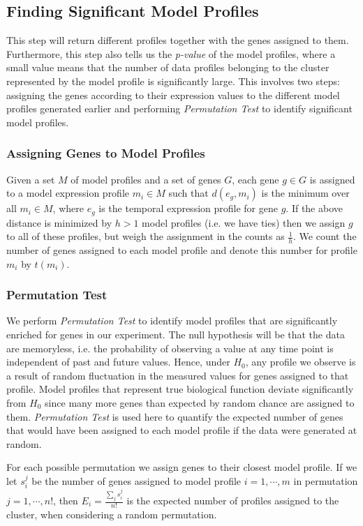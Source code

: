 \subsection{Finding Significant Model Profiles}
This step will return different profiles together with the genes assigned to them. Furthermore, this step also tells us the \textit{p-value} of the model profiles, where a small value means that the number of data profiles belonging to the cluster represented by the model profile is significantly large. This involves two steps: assigning the genes according to their expression values to the different model profiles generated earlier and performing \textit{Permutation Test} to identify significant model profiles.

\subsubsection{Assigning Genes to Model Profiles}
Given a set $M$ of model profiles and a set of genes $G$, each gene $g \in G$ is assigned to a model expression profile $m_i \in M$ such that $d(e_g, m_i)$ is the minimum over all $m_i \in M$, where $e_g$ is the temporal expression profile for gene $g$. If the above distance is minimized by $h>1$ model profiles (i.e. we have ties) then we assign $g$ to all of these profiles, but weigh the assignment in the counts as $\frac{1}{h}$. We count the number of genes assigned to each model profile and denote this number for profile $m_i$ by $t(m_i)$.

\subsubsection{Permutation Test}
We perform \textit{Permutation Test} to identify model profiles that are significantly enriched for genes in our experiment. The null hypothesis will be that the data are memoryless, i.e. the probability of observing a value at any time point is independent of past and future values. Hence, under $H_0$, any profile we observe is a result of random fluctuation in the measured values for genes assigned to that profile. Model profiles that represent true biological function deviate significantly from $H_0$ since many more genes than expected by random chance are assigned to them. \textit{Permutation Test} is used here to quantify the expected number of genes that would have been assigned to each model profile if the data were generated at random. 

For each possible permutation we assign genes to their closest model profile. If we let $s_i^j$ be the number of genes assigned to model profile $i = 1,\cdots,m$ in permutation $j=1,\cdots,n!$, then $E_i = \frac{\sum_j s_i^j}{n!}$ is the expected number of profiles assigned to the cluster, when considering a random permutation.

